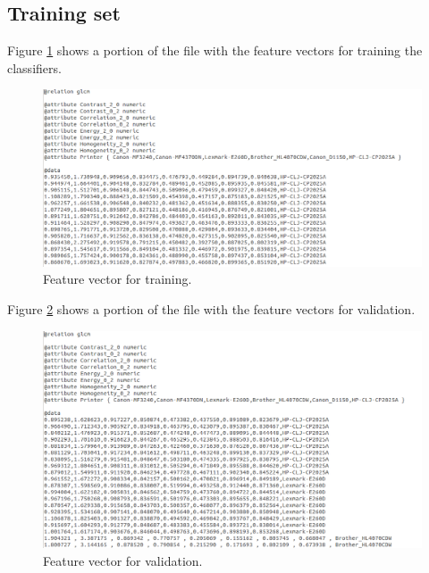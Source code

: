 \documentclass[10pt,twocolumn,letterpaper]{article}
\begin{document}
\subsection{Training set}

Figure \ref{fig:feature_vector} shows a portion of the file with the feature vectors for training the classifiers.

\begin{figure}
\begin{center}
	\includegraphics[width=2\columnwidth]{feature_vector}
	\caption{Feature vector for training.}
\label{fig:feature_vector}   
\end{center} 
\end{figure}

Figure \ref{fig:validation} shows a portion of the file with the feature vectors for validation.

\begin{figure}
\begin{center}
	\includegraphics[width=2\columnwidth]{validation}
	\caption{Feature vector for validation.}
\label{fig:validation}   
\end{center} 
\end{figure}
\end{document}
